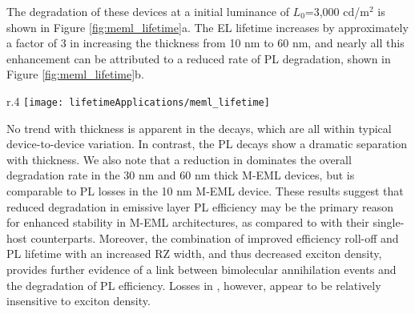 \documentclass[../thesis.tex]{subfiles}
\begin{document}
The degradation of these devices at a initial luminance of $L_0$=3,000 cd/m$^2$ is shown in Figure \ref{fig:meml_lifetime}a.
The EL lifetime increases by approximately a factor of 3 in increasing the thickness from 10 nm to 60 nm, and nearly all this enhancement can be attributed to a reduced rate of PL degradation, shown in Figure \ref{fig:meml_lifetime}b.
\begin{wrapfigure}{r}{.4\textwidth}
\centering
\texttt{[image: lifetimeApplications/meml\_lifetime]}
\caption{a. EL lifetime at 3,000 cd/m$^2$ for EML thicknesses of 10,30,60 nm.  b. The corresponding \pl and \ef degradation.}
\label{fig:meml_lifetime}
\end{wrapfigure}
No trend with thickness is apparent in the \ef decays, which are all within typical device-to-device variation. 
In contrast, the PL decays show a dramatic separation with thickness. 
We also note that a reduction in \ef dominates the overall degradation rate in the 30 nm and 60 nm thick M-EML devices, but is comparable to PL losses in the 10 nm M-EML device. 
These results suggest that reduced degradation in emissive layer PL efficiency may be the primary reason for enhanced stability in M-EML architectures, as compared to with their single-host counterparts. 
Moreover, the combination of improved efficiency roll-off and PL lifetime with an increased RZ width, and thus decreased exciton density, provides further evidence of a link between bimolecular annihilation events and the degradation of PL efficiency. \supercite{Schmidbauer2013}
Losses in \ef, however, appear to be relatively insensitive to exciton density.
\end{document}
